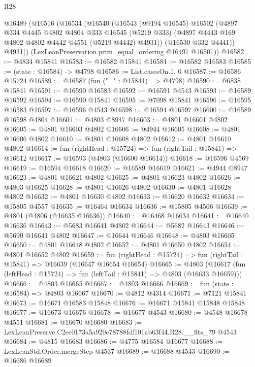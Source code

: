 \begin{lexlean}{R28}
\begin{coremodule}
  @16489
    (@16516
      (@16534
        (@16540
          (@16543
            (@9194 @16545)
            @16502
            (@4897
              @334
              @4445
              @4802
              @4804
              @333
              @16545
              (@5219 @333)
              (@4897 @4443 @169 @4802 @4802 @4442 @4551 (@5219 @4442) @4931))
            (@16530 @332 @4441))
          @4931))
      (LexLeanPreservation.prim_equal_ordering @16497 @16501))
@16582 := @4834 @15841
@16583 := @16582 @15841
@16584 := @16582 @16583
@16585 := (state : @16584) -> @4798
@16586 := List.casesOn.{1, 0}
@16587 := @16586 @15724
@16589 := @16587 (fun ("_" : @15841) => @4798)
@16590 := @6838 @15841
@16591 := @16590 @16583
@16592 := @16591 @4543
@16593 := @16589 @16592
@16594 := @16590 @15841
@16595 := @7098 @15841
@16596 := @16595 @16583
@16597 := @16596 @4543
@16598 := @16594 @16597
@16600 := @16589 @16598 @4804
@16601 := @4803 @8947
@16603 := @4801 @16601 @4802
@16605 := @4801 @16603 @4802
@16606 := @4944 @16605
@16608 := @4801 @16606 @4802
@16610 := @4801 @16608 @4802
@16612 := @4801 @16610 @4802
@16614 := fun (rightHead : @15724) => fun (rightTail : @15841) => @16612
@16617 := @16593 (@4803 (@16600 @16614))
@16618 := @16596 @4569
@16619 := @16594 @16618
@16620 := @16589 @16619
@16621 := @4944 @8947
@16623 := @4801 @16621 @4802
@16625 := @4801 @16623 @4802
@16626 := @4803 @16625
@16628 := @4801 @16626 @4802
@16630 := @4801 @16628 @4802
@16632 := @4801 @16630 @4802
@16633 := @16620 @16632
@16634 := @15805 @4557
@16635 := @16464 @16634
@16636 := @15805 @4566
@16639 := @4801 (@4806 (@16635 @16636))
@16640 := @16468 @16634
@16641 := @16640 @16636
@16643 := @5683 @16641 @4802
@16644 := @5682 @16643
@16646 := @5690 @16641 @4802
@16647 := @16644 @16646
@16648 := @4803 @16605
@16650 := @4801 @16648 @4802
@16652 := @4801 @16650 @4802
@16654 := @4801 @16652 @4802
@16659 := fun (rightHead : @15724) => fun (rightTail : @15841) => @16639 (@16647 @16654 @16654)
@16665 := @4803
    (@16617 (fun (leftHead : @15724) => fun (leftTail : @15841) => @4803 (@16633 @16659)))
@16666 := @4803 @16665
@16667 := @4803 @16666
@16669 := fun (state : @16584) => @4803 @16667
@16670 := @4812 @4314
@16671 := @7121 @15841
@16673 := @16671 @16583 @15848
@16676 := @16671 @15841 @15848 @15848
@16677 := @16673 @16676
@16678 := @16677 @4543
@16680 := @4548 @16678 @4551
@16681 := @16670 @16680
@16683 := LexLeanPreserve.C2ee0173a5a920c78788fdf101ab63f44.R28.__fits_79 @4543
@16684 := @4815 @16683
@16686 := @4775 @16584 @16677
@16688 := LexLeanStd.Order.mergeStep @4537
@16689 := @16688 @4543
@16690 := @16686 @16689

\end{coremodule}
\end{lexlean}
